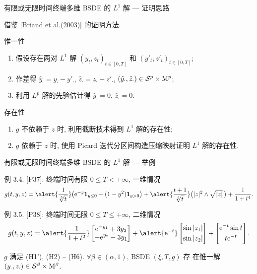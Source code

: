 \documentclass[xcolor=svgnames,serif,table,10pt]{beamer}
\newcommand{\tT}[1][0]{[#1,T]}
\newcommand{\s}{\mathcal{S}}
\newcommand{\me}{\mathrm{e}}
\newcommand{\one}[1]{{\bf 1}_{#1}}
\renewcommand{\M}{{\rm M}}
\begin{document}
\begin{frame}{有限或无限时间终端多维 BSDE 的 $L^1$ 解 --- 证明思路}

  借鉴 [Briand et al.(2003)] 的证明方法.
  \begin{block}{惟一性}
    \begin{enumerate}
      \item 假设存在两对 $L^1$ 解 $(y_t,z_t)_{t\in\tT}$ 和 $(y'_t,z'_t)_{t\in\tT}$;
      \item 作差得 $\hat y_\cdot=y_\cdot-y'_\cdot$, $\hat z_\cdot=z_\cdot-z'_\cdot$,
            $(\hat y_\cdot,\hat z_\cdot)\in\s^p\times\M^p$;
      \item 利用 $L^p$ 解的先验估计得 $\hat y_\cdot=0$, $\hat z_\cdot=0$.
    \end{enumerate}
  \end{block}
  \pause
  \begin{block}{存在性}
    \begin{enumerate}
      \item $g$ 不依赖于 $z$ 时, 利用\alert{截断}技术得到 $L^1$ 解的存在性;
      \item $g$ 依赖于 $z$ 时, 使用 \alert{Picard 迭代}分区间构造压缩映射证明 $L^1$ 解的存在性.
    \end{enumerate}
  \end{block}
\end{frame}

\begin{frame}{有限或无限时间终端多维 BSDE 的 $L^1$ 解 --- 举例}
  \begin{exampleblock}{例 3.4. [P37]: 终端时间有限 $0\leq T<+\infty$, 一维情况}
    $$g(t,y,z)=\alert{\frac{1}{\sqrt[3]{t\,}}}
    \big(\me^{-y}\one{y\leq 0}+(1-y^2)\one{y>0}\big)
    +\alert{\frac{t+1}{\sqrt[4]{t\,}}}\big(|z|^2\wedge\sqrt{|z|}\,\big)+\frac{1}{1+t^4}.$$
  \end{exampleblock}

  \begin{exampleblock}{例 3.5. [P38]: 终端时间无限 $0\leq T\leq +\infty$, 二维情况}
    \begin{equation*}
      g(t,y,z)=\alert{\frac{1}{1+t^2}}
      \begin{bmatrix}
        \displaystyle\me^{-y_1}+3y_2\\
        \displaystyle-\me^{y_2}-3y_1
      \end{bmatrix}+\alert{\me^{-t}}
      \begin{bmatrix}
        \displaystyle\sin|z_1|\\[3pt]
        \displaystyle\sin|z_2|
      \end{bmatrix}+
      \begin{bmatrix}
        \displaystyle\me^{-t}\sin t\\[3pt]
        \displaystyle t\me^{-t}
      \end{bmatrix}.
    \end{equation*}
  \end{exampleblock}

  \qquad $g$ 满足 (H1'), (H2) -- (H6). $\forall\beta\in(\alpha,1)$, BSDE $(\xi,T,g)$ 存
  在惟一解 $(y_\cdot,z_\cdot)\in\s^\beta\times\M^\beta$.
\end{frame}
\end{document}
